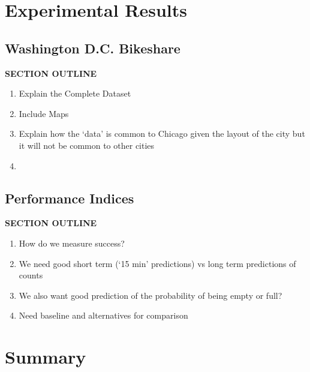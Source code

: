 \documentclass{acm_proc_article-sp}
\begin{document}
\section{Experimental Results}

\vspace{0.25cm}

\subsection{Washington D.C. Bikeshare}
\vspace{0.25cm}
{\bf SECTION OUTLINE}
\begin{enumerate}
\item Explain the Complete Dataset
\item Include Maps
\item Explain how the `data' is common to Chicago given the layout of the city but it will not be common to other cities
\item 
\end{enumerate}
\vspace{0.5cm}

\subsection{Performance Indices}

\vspace{0.25cm}
{\bf SECTION OUTLINE}
\begin{enumerate}
\item How do we measure success?
\item We need good short term (`15 min' predictions) vs long term predictions of counts
\item We also want good prediction of the probability of being empty or full?
\item Need baseline and alternatives for comparison
\end{enumerate}
\vspace{0.5cm}

\section{Summary}
\end{document}
